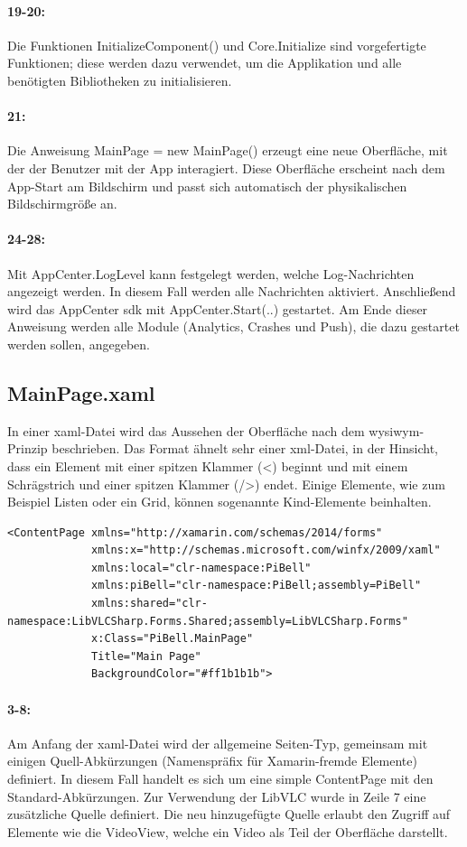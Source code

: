 \paragraph{19-20:} Die Funktionen InitializeComponent() und Core.Initialize sind vorgefertigte Funktionen; diese werden dazu verwendet, um die Applikation und alle benötigten Bibliotheken zu initialisieren.
\paragraph{21:} Die Anweisung MainPage = new MainPage() erzeugt eine neue Oberfläche, mit der der Benutzer mit der App interagiert. Diese Oberfläche erscheint nach dem App-Start am Bildschirm und passt sich automatisch der physikalischen Bildschirmgröße an.
\paragraph{24-28:} Mit AppCenter.LogLevel kann festgelegt werden, welche Log-Nachrichten angezeigt werden. In diesem Fall werden alle Nachrichten aktiviert.
Anschließend wird das AppCenter \ac{sdk} mit AppCenter.Start(..) gestartet. Am Ende dieser Anweisung werden alle Module (Analytics, Crashes und Push), die dazu gestartet werden sollen, angegeben.

\subsection{MainPage.xaml}
In einer \ac{xaml}-Datei wird das Aussehen der Oberfläche nach dem \ac{wysiwym}-Prinzip beschrieben. Das Format ähnelt sehr einer \ac{xml}-Datei, in der Hinsicht, dass ein Element mit einer spitzen Klammer (<) beginnt und mit einem Schrägstrich und einer spitzen Klammer (/>) endet. Einige Elemente, wie zum Beispiel Listen oder ein Grid, können sogenannte Kind-Elemente beinhalten.
\begin{verbatim}
<ContentPage xmlns="http://xamarin.com/schemas/2014/forms"
             xmlns:x="http://schemas.microsoft.com/winfx/2009/xaml"
             xmlns:local="clr-namespace:PiBell"
             xmlns:piBell="clr-namespace:PiBell;assembly=PiBell"
             xmlns:shared="clr-namespace:LibVLCSharp.Forms.Shared;assembly=LibVLCSharp.Forms"
             x:Class="PiBell.MainPage"
             Title="Main Page"
             BackgroundColor="#ff1b1b1b">
\end{verbatim}
\paragraph{3-8:} Am Anfang der \ac{xaml}-Datei wird der allgemeine Seiten-Typ, gemeinsam mit einigen Quell-Abkürzungen (Namenspräfix für Xamarin-fremde Elemente) definiert. In diesem Fall handelt es sich um eine simple ContentPage mit den Standard-Abkürzungen. Zur Verwendung der LibVLC wurde in Zeile 7 eine zusätzliche Quelle definiert. Die neu hinzugefügte Quelle erlaubt den Zugriff auf Elemente wie die VideoView, welche ein Video als Teil der Oberfläche darstellt.
